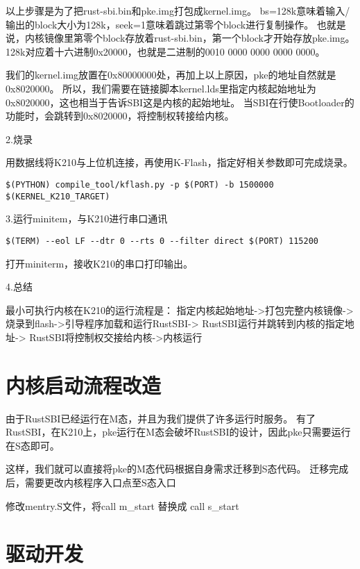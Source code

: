 以上步骤是为了把rust-sbi.bin和pke.img打包成kernel.img。
bs=128k意味着输入/输出的block大小为128k，seek=1意味着跳过第零个block进行复制操作。
也就是说，内核镜像里第零个block存放着rust-sbi.bin，第一个block才开始存放pke.img。
128k对应着十六进制0x20000，也就是二进制的0010 0000 0000 0000 0000。

我们的kernel.img放置在0x80000000处，再加上以上原因，pke的地址自然就是0x8020000。
所以，我们需要在链接脚本kernel.lds里指定内核起始地址为0x8020000，这也相当于告诉SBI这是内核的起始地址。
当SBI在行使Bootloader的功能时，会跳转到0x8020000，将控制权转接给内核。

2.烧录

用数据线将K210与上位机连接，再使用K-Flash，指定好相关参数即可完成烧录。

\begin{lstlisting}[caption={烧录}, label={lst:burn}]
    $(PYTHON) compile_tool/kflash.py -p $(PORT) -b 1500000 $(KERNEL_K210_TARGET)
\end{lstlisting}

3.运行minitem，与K210进行串口通讯

\begin{lstlisting}[caption={运行minitem}, label={lst:run_minitem}]
    $(TERM) --eol LF --dtr 0 --rts 0 --filter direct $(PORT) 115200
\end{lstlisting}

打开miniterm，接收K210的串口打印输出。

4.总结

最小可执行内核在K210的运行流程是：
指定内核起始地址->打包完整内核镜像->
烧录到flash->引导程序加载和运行RustSBI->
RustSBI运行并跳转到内核的指定地址->
RustSBI将控制权交接给内核->内核运行

\section{内核启动流程改造}

由于RustSBI已经运行在M态，并且为我们提供了许多运行时服务。
有了RustSBI，在K210上，pke运行在M态会破坏RustSBI的设计，因此pke只需要运行在S态即可。

这样，我们就可以直接将pke的M态代码根据自身需求迁移到S态代码。
迁移完成后，需要更改内核程序入口点至S态入口

修改mentry.S文件，将call m\_start 替换成 call s\_start

\section{驱动开发}

